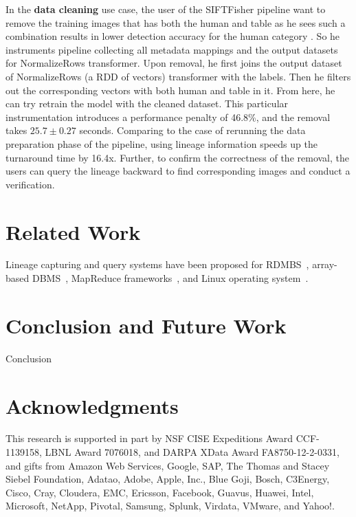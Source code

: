 \documentclass{sig-alternate}
\begin{document}
In the {\bf data cleaning} use case, the user of the SIFTFisher pipeline want to remove the training images that has both the human and table as
he sees such a combination results in lower detection accuracy for the human category .
So he instruments pipeline collecting all metadata mappings and the output datasets for NormalizeRows transformer. 
Upon removal, he first joins the output dataset of NormalizeRows (a RDD of vectors) transformer with the labels.
Then he filters out the corresponding vectors with both human and table in it. 
From here, he can try retrain the model with the cleaned dataset. 
This particular instrumentation introduces a performance penalty of 46.8\%, and the removal takes $25.7\pm0.27$ seconds.
Comparing to the case of rerunning the data preparation phase of the pipeline, using lineage information speeds up the turnaround
time by 16.4x. Further, to confirm the correctness of the removal, the users can query the lineage backward to find corresponding 
images and conduct a verification.

\section{Related Work}
\label{sec:Related}
Lineage capturing and query systems have been proposed for RDMBS~\cite{widom04}, array-based
DBMS~\cite{wu13}, MapReduce frameworks~\cite{ikeda11, logothetis13}, and Linux operating system~\cite{devecsery14}.


\section{Conclusion and Future Work}
\label{sec:Conclusion}
Conclusion

\section{Acknowledgments}
This research is supported in part by NSF CISE Expeditions Award CCF-1139158, LBNL Award 7076018, and DARPA XData Award FA8750-12-2-0331, and gifts from Amazon Web Services, Google, SAP,  The Thomas and Stacey Siebel Foundation, Adatao, Adobe, Apple, Inc., Blue Goji, Bosch, C3Energy, Cisco, Cray, Cloudera, EMC, Ericsson, Facebook, Guavus, Huawei, Intel, Microsoft, NetApp, Pivotal, Samsung, Splunk, Virdata, VMware, and Yahoo!. 

%

%
%



\balancecolumns

\end{document}
